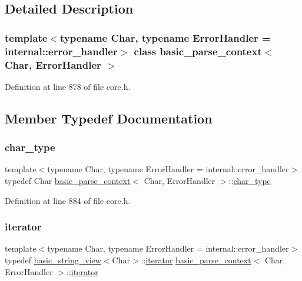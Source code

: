 \subsection{Detailed Description}
\subsubsection*{template$<$typename Char, typename Error\+Handler = internal\+::error\+\_\+handler$>$\newline
class basic\+\_\+parse\+\_\+context$<$ Char, Error\+Handler $>$}



Definition at line 878 of file core.\+h.



\subsection{Member Typedef Documentation}
\mbox{\label{classbasic__parse__context_a09eb161010dcd5587f3a425a6d6d4524}} 
\subsubsection{\texorpdfstring{char\+\_\+type}{char\_type}}
{\footnotesize\ttfamily template$<$typename Char, typename Error\+Handler = internal\+::error\+\_\+handler$>$ \\
typedef Char \hyperlink{classbasic__parse__context}{basic\+\_\+parse\+\_\+context}$<$ Char, Error\+Handler $>$\+::\hyperlink{classbasic__parse__context_a09eb161010dcd5587f3a425a6d6d4524}{char\+\_\+type}}



Definition at line 884 of file core.\+h.

\mbox{\label{classbasic__parse__context_ac3ff96575e89371a99076d8e84dbdbee}} 
\subsubsection{\texorpdfstring{iterator}{iterator}}
{\footnotesize\ttfamily template$<$typename Char, typename Error\+Handler = internal\+::error\+\_\+handler$>$ \\
typedef \hyperlink{classbasic__string__view}{basic\+\_\+string\+\_\+view}$<$Char$>$\+::\hyperlink{classbasic__parse__context_ac3ff96575e89371a99076d8e84dbdbee}{iterator} \hyperlink{classbasic__parse__context}{basic\+\_\+parse\+\_\+context}$<$ Char, Error\+Handler $>$\+::\hyperlink{classbasic__parse__context_ac3ff96575e89371a99076d8e84dbdbee}{iterator}}



